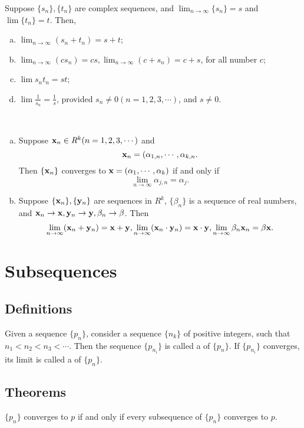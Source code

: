 \begin{theorem}
	Suppose $\{s_n\}, \{t_n\}$ are complex sequences, and $\lim_{n \to \infty} \{s_n\} = s$ and $\lim \{t_n\} = t$. Then,
	\begin{enumerate}[(a)]
		\item $\lim_{n \to \infty} (s_n + t_n) = s + t$;
		\item $\lim_{n \to \infty} (cs_n) = cs, \lim_{n \to \infty} (c+s_n) = c + s$, for all number $c$;		
		\item $\lim s_n t_n = st$;
		\item $\lim \frac{1}{s_n} = \frac{1}{s}$, provided $s_n \ne 0 (n=1,2,3,\cdots)$, and $s \ne 0$.
	\end{enumerate}	
\end{theorem}

\begin{theorem}
	~
	\begin{enumerate}[(a)]
		\item Suppose ${\bf{x}}_n \in R^k (n=1,2,3,\cdots)$ and $${\bf{x}}_n = (\alpha_{1,n}, \cdots, \alpha_{k,n}.$$ Then $\{{\bf{x}}_n\}$ converges to ${\bf{x}}=(\alpha_1,\cdots,\alpha_k)$ if and only if $$\lim_{n \to \infty} \alpha_{j,n} = \alpha_j.$$
		\item Suppose $\{{\bf{x}}_n\},\{{\bf{y}}_n\}$ are sequences in $R^k$, $\{\beta_n\}$ is a sequence of real numbers, and ${\bf{x}}_n \to {\bf{x}}, {\bf{y}}_n \to {\bf{y}}, \beta_n \to \beta$. Then $$\lim_{n \to \infty} ({\bf{x}}_n+{\bf{y}}_n) = {\bf{x}} + {\bf{y}}, \lim_{n \to \infty} ({\bf{x}}_n \cdot {\bf{y}}_n) = {\bf{x}} \cdot {\bf{y}}, \lim_{n \to \infty} \beta_n {\bf{x}}_n = \beta {\bf{x}}.$$
	\end{enumerate}
\end{theorem}


\section{Subsequences}
\subsection{Definitions}
\begin{definition}\label{def:sublim}
	Given a sequence $\{p_n\}$, consider a sequence $\{n_k\}$ of positive integers, such that $n_1 < n_2 < n_3 < \cdots$. Then the sequence $\{p_{n_i}\}$ is called a {} of $\{p_n\}$. If $\{p_{n_i}\}$ converges, its limit is called a {} of $\{p_n\}$.
\end{definition}

\subsection{Theorems}
\begin{theorem}
	$\{p_n\}$ converges to $p$ if and only if every subsequence of $\{p_n\}$ converges to $p$.
\end{theorem}


